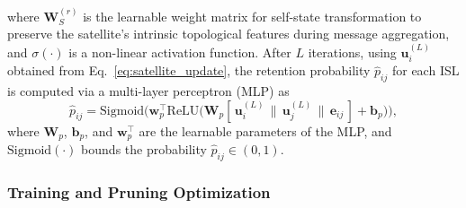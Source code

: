 where $\mathbf{W}_S^{(r)}$ is the learnable weight matrix for self-state transformation to preserve the satellite's intrinsic topological features during message aggregation, and $\sigma(\cdot)$ is a non-linear activation function. After $L$ iterations, using $\mathbf{u}_i^{(L)}$ obtained from Eq.~\eqref{eq:satellite_update}, the retention probability $\hat{p}_{ij}$ for each ISL is computed via a multi-layer perceptron (MLP) as
\begin{equation} \label{eq:readout}
    \hat{p}_{ij} = \mathrm{Sigmoid} \Big( \mathbf{w}_p^\top \mathrm{ReLU} \big( \mathbf{W}_p [\, \mathbf{u}_i^{(L)} \,\|\, \mathbf{u}_j^{(L)} \,\|\, \mathbf{e}_{ij} \,] + \mathbf{b}_p \big) \Big),
\end{equation}
where $\mathbf{W}_p$, $\mathbf{b}_p$, and $\mathbf{w}_p^\top$ are the learnable parameters of the MLP, and $\mathrm{Sigmoid}(\cdot)$ bounds the probability $\hat{p}_{ij} \in (0,1)$.

\subsubsection{Training and Pruning Optimization}


